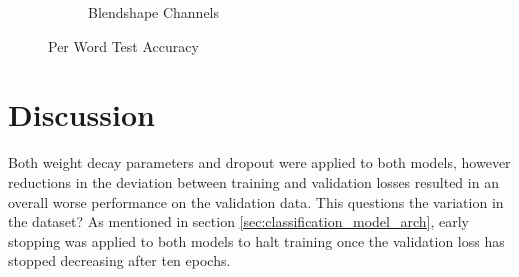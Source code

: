 \begin{figure}[h!]
\begin{subfigure}[b]{0.49\textwidth}
        \caption{Blendshape Channels}\label{fig:channels_word_acc}
    \end{subfigure}
    \caption{Per Word Test Accuracy}\label{fig:both_models_word_acc}
\end{figure}

\section{Discussion}
Both weight decay parameters and dropout were applied to both models, however reductions in the deviation between training and validation losses resulted in an overall worse performance on the validation data.
This questions the variation in the dataset?
As mentioned in section \ref{sec:classification_model_arch}, early stopping was applied to both models to halt training once the validation loss has stopped decreasing after ten epochs.

%
%
%